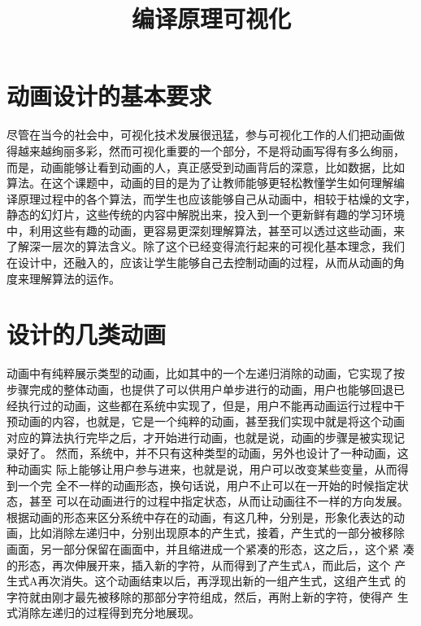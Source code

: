 \documentclass{article}
\begin{document}
\title{编译原理可视化}

\section{动画设计的基本要求}
尽管在当今的社会中，可视化技术发展很迅猛，参与可视化工作的人们把动画做
得越来越绚丽多彩，然而可视化重要的一个部分，不是将动画写得有多么绚丽，
而是，动画能够让看到动画的人，真正感受到动画背后的深意，比如数据，比如
算法。在这个课题中，动画的目的是为了让教师能够更轻松教懂学生如何理解编
译原理过程中的各个算法，而学生也应该能够自己从动画中，相较于枯燥的文字，
静态的幻灯片，这些传统的内容中解脱出来，投入到一个更新鲜有趣的学习环境
中，利用这些有趣的动画，更容易更深刻理解算法，甚至可以透过这些动画，来
了解深一层次的算法含义。除了这个已经变得流行起来的可视化基本理念，我们
在设计中，还融入的，应该让学生能够自己去控制动画的过程，从而从动画的角
度来理解算法的运作。
\section{设计的几类动画}
动画中有纯粹展示类型的动画，比如其中的一个左递归消除的动画，它实现了按
步骤完成的整体动画，也提供了可以供用户单步进行的动画，用户也能够回退已
经执行过的动画，这些都在系统中实现了，但是，用户不能再动画运行过程中干
预动画的内容，也就是，它是一个纯粹的动画，甚至我们实现中就是将这个动画
对应的算法执行完毕之后，才开始进行动画，也就是说，动画的步骤是被实现记
录好了。
然而，系统中，并不只有这种类型的动画，另外也设计了一种动画，这种动画实
际上能够让用户参与进来，也就是说，用户可以改变某些变量，从而得到一个完
全不一样的动画形态，换句话说，用户不止可以在一开始的时候指定状态，甚至
可以在动画进行的过程中指定状态，从而让动画往不一样的方向发展。
根据动画的形态来区分系统中存在的动画，有这几种，分别是，形象化表达的动
画，比如消除左递归中，分别出现原本的产生式，接着，产生式的一部分被移除
画面，另一部分保留在画面中，并且缩进成一个紧凑的形态，这之后，，这个紧
凑的形态，再次伸展开来，插入新的字符，从而得到了产生式A，而此后，这个
产生式A再次消失。这个动画结束以后，再浮现出新的一组产生式，这组产生式
的字符就由刚才最先被移除的那部分字符组成，然后，再附上新的字符，使得产
生式消除左递归的过程得到充分地展现。
\end{document}
